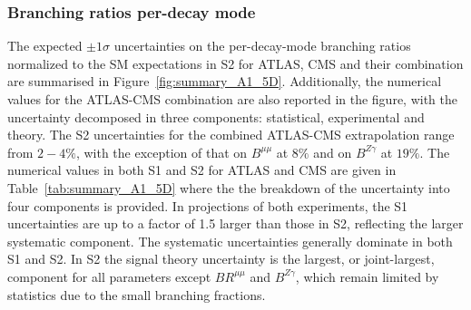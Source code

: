 



\subsubsection{Branching ratios per-decay mode}

The expected $\pm 1\sigma$ uncertainties on the per-decay-mode branching ratios normalized to the SM expectations in S2 for ATLAS, CMS and their combination are summarised in Figure~\ref{fig:summary_A1_5D}.
Additionally, the numerical values for the ATLAS-CMS combination  are also reported in the figure, with the uncertainty decomposed in three components: statistical, experimental and theory.
The S2 uncertainties for the combined ATLAS-CMS extrapolation range from $2-4\%$, with the exception of that on $B^{\mu\mu}$ at $8\%$ and on $B^{Z\gamma}$ at $19\%$.
The numerical values in both S1 and S2 for ATLAS and CMS are given in Table~\ref{tab:summary_A1_5D} where the the breakdown of the uncertainty into four components  is provided. 
In projections of both experiments, the S1 uncertainties are up to a factor of 1.5 larger than those in S2, reflecting the larger systematic component. 
 The systematic uncertainties generally dominate in both S1 and S2. In S2 the signal theory uncertainty is the largest, or joint-largest, component for all parameters except $BR^{\mu\mu}$ and $B^{Z\gamma}$, which remain limited by statistics due to the small  branching fractions. %


